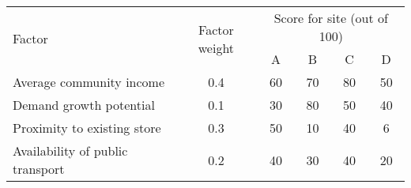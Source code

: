 \begin{center}
\begin{tabular}{|p{4cm}|c|c|c|c|c|}
\hline
\multirow{2}{*}{Factor} & \multirow{2}{*}{Factor weight} & \multicolumn{4}{c|}{Score for site (out of 100)} \\
\cline{3-6}
& & A & B & C & D \\
\hline
Average community income & 0.4 & 60 & 70 & 80 & 50 \\
\hline
Demand growth potential & 0.1 & 30 & 80 & 50 & 40 \\
\hline
Proximity to existing store & 0.3 & 50 & 10 & 40 & 6 \\
\hline
Availability of public transport & 0.2 & 40 & 30 & 40 & 20 \\
\hline
\end{tabular}
\end{center}
